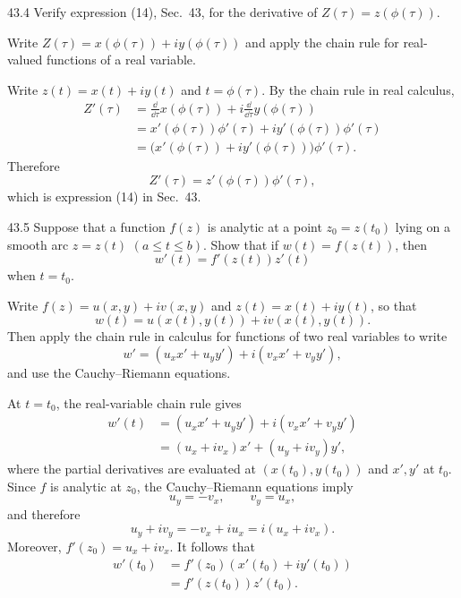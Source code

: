 \documentclass[11pt,oneside]{article}
\begin{document}
\begin{exercise}{43.4}
Verify expression (14), Sec.~43, for the derivative of \(Z(\tau)=z(\phi(\tau))\).
\begin{suggestion}
Write \(Z(\tau)=x(\phi(\tau))+iy(\phi(\tau))\) and apply the chain rule for real-valued functions of a real variable.
\end{suggestion}
\end{exercise}

\begin{solution}
Write \(z(t)=x(t)+iy(t)\) and \(t=\phi(\tau)\). By the chain rule in real calculus,
\[
\begin{aligned}
    Z'(\tau)
    &=\frac{\dd}{\dd\tau}x(\phi(\tau))
      +i\frac{\dd}{\dd\tau}y(\phi(\tau))\\
    &=x'(\phi(\tau))\phi'(\tau)
      +iy'(\phi(\tau))\phi'(\tau)\\
    &=\bigl(x'(\phi(\tau))+iy'(\phi(\tau))\bigr)\phi'(\tau).
\end{aligned}
\]
Therefore
\[
    \boxed{Z'(\tau)=z'(\phi(\tau))\phi'(\tau)},
\]
which is expression (14) in Sec.~43.
\end{solution}

\begin{exercise}{43.5}
Suppose that a function \(f(z)\) is analytic at a point \(z_0=z(t_0)\) lying on a smooth arc \(z=z(t)\) \((a\le t\le b)\). Show that if \(w(t)=f(z(t))\), then
\[
    w'(t)=f'(z(t))z'(t)
\]
when \(t=t_0\).
\begin{suggestion}
Write \(f(z)=u(x, y)+iv(x, y)\) and \(z(t)=x(t)+iy(t)\), so that
\[
    w(t)=u(x(t), y(t))+iv(x(t), y(t)).
\]
Then apply the chain rule in calculus for functions of two real variables to write
\[
    w'=(u_xx'+u_yy')+i(v_xx'+v_yy'),
\]
and use the Cauchy--Riemann equations.
\end{suggestion}
\end{exercise}

\begin{solution}
At \(t=t_0\), the real-variable chain rule gives
\[
\begin{aligned}
    w'(t)
    &=(u_xx'+u_yy')+i(v_xx'+v_yy')\\
    &=(u_x+iv_x)x'+(u_y+iv_y)y',
\end{aligned}
\]
where the partial derivatives are evaluated at \((x(t_0), y(t_0))\) and \(x', y'\) at \(t_0\). Since \(f\) is analytic at \(z_0\), the Cauchy--Riemann equations imply
\[
    u_y=-v_x, \qquad v_y=u_x,
\]
and therefore
\[
    u_y+iv_y=-v_x+iu_x=i(u_x+iv_x).
\]
Moreover, \(f'(z_0)=u_x+iv_x\). It follows that
\[
\begin{aligned}
    w'(t_0)
    &=f'(z_0)(x'(t_0)+iy'(t_0))\\
    &=\boxed{f'(z(t_0))z'(t_0)}.
\end{aligned}
\]
\end{solution}
\end{document}
